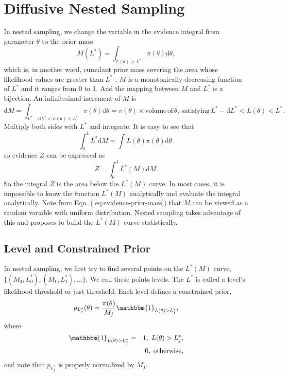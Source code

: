 \documentclass[letterpaper, preprint]{aastex}
\begin{document}
\section{Diffusive Nested Sampling}

In nested sampling, we change the variable in the evidence integral from parameter $\theta$ to the prior mass
\begin{equation}
M(L^*)=\int_{L(\theta)>L^*}\!\pi(\theta)\mathrm{d}\theta,
 \label{eq:prior-mass}
\end{equation}
which is, in another word, cumulant prior mass covering the area whose likelihood values are greater than $L^*$ \citep{skilling06a}. $M$ is a monotonically decreasing function of $L^*$ and it ranges from 0 to 1. And the mapping between $M$ and $L^*$ is a bijection. An infinitesimal increment of $M$ is
\begin{equation}
\mathrm{d}M=\int_{L^*-\mathrm{d}L^*<L(\theta)<L^*}\!\pi(\theta)\mathrm{d}\theta = \pi(\theta)\times \mathrm{volume\,of}\,\theta,\,\mathrm{satisfying}\, L^*-\mathrm{d}L^*<L(\theta)<L^*.
\end{equation}
Multiply both sides with $L^*$ and integrate. It is easy to see that
\begin{equation}
\int^1_0\! L^*\mathrm{d}M=\int\!L(\theta)\pi(\theta)\mathrm{d}\theta.
\end{equation}
so evidence $Z$ can be expressed as
\begin{equation}
Z=\int^1_0\! L^*(M)\mathrm{d}M.
 \label{eq:evidence-prior-mass}
\end{equation}
So the integral $Z$ is the area below the $L^*(M)$ curve. In most cases, it is impossible to know the function $L^*(M)$ analytically and evaluate the integral analytically. Note from Eqn. (\ref{eq:evidence-prior-mass}) that $M$ can be viewed as a random variable with uniform distribution. Nested sampling takes advantage of this and proposes to build the $L^*(M)$ curve statistically.

\subsection{Level and Constrained Prior}
In nested sampling, we first try to find several points on the $L^*(M)$ curve, $\{(M_0, L_0^*),(M_1,L_1^*),\ldots\}$. We call these points levels. The $L^*$ is called a level's likelihood threshold or just threshold. Each level defines a constrained prior,
\begin{equation} 
p_{L_j^*}(\theta) = \frac{\pi(\theta)}{M_j}\mathbbm{1}_{L(\theta)>L_j^*},
\label{eq:constrained-prior}
\end{equation}
where
\begin{eqnarray*}
\mathbbm{1}_{L(\theta)>L_j^*} &=& 1,\,\,L(\theta)>L_j^*,\\
& &0,\,\,\mathrm{otherwise},
\end{eqnarray*}
and note that $p_{L_j^*}$ is properly normalized by $M_j$. 
\end{document}
